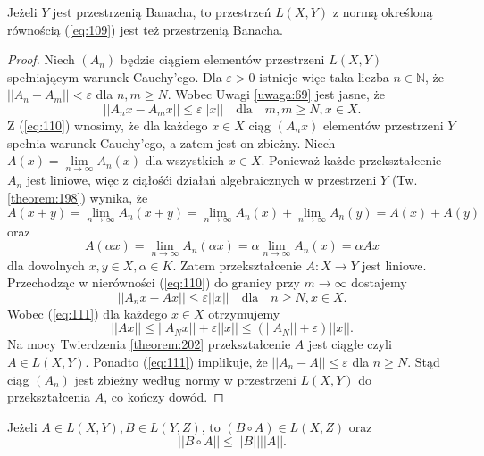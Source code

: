 \documentclass[leqno]{article}
\begin{document}
\begin{justify}
\begin{theorem}
{
    Jeżeli $Y$ jest przestrzenią Banacha, to przestrzeń $L(X, Y)$ z normą określoną równością (\ref{eq:109}) jest też przestrzenią Banacha.
}
\end{theorem}

\begin{proof}
    Niech $(A_n)$ będzie ciągiem elementów przestrzeni $L(X, Y)$ spełniającym warunek Cauchy'ego. 
    Dla $\varepsilon > 0$ istnieje więc taka liczba $n \in \mathbb{N}$, że $||A_n - A_m|| < \varepsilon$ dla $n,m \geqslant N$.
    Wobec Uwagi \ref{uwaga:69} jest jasne, że 
    \begin{equation}\label{eq:110}
        ||A_nx - A_m x|| \leqslant \varepsilon||x|| \quad \text{dla} \quad m,m \geqslant N, x \in X.
    \end{equation}
    Z (\ref{eq:110}) wnosimy, że dla każdego $x \in X$ ciąg $(A_n x)$ elementów przestrzeni $Y$ spełnia warunek
    Cauchy'ego, a zatem jest on zbieżny. Niech $A(x) = \lim\limits_{n \to \infty} A_n(x)$ dla
    wszystkich $x \in X$. Ponieważ każde przekształcenie $A_n$ jest liniowe, więc z ciąłośći działań algebraicznych 
    w przestrzeni $Y$ (Tw. \ref{theorem:198}) wynika, że 
    \[
        A(x + y) = \lim\limits_{n \to \infty} A_n(x + y) = \lim\limits_{n \to \infty}A_n(x) + \lim\limits_{n \to \infty}A_n(y) = A(x) + A(y)
    \]
    oraz
    \[
        A(\alpha x) = \lim\limits_{n \to \infty} A_n(\alpha x) = \alpha \lim\limits_{n \to \infty}A_n(x) = \alpha A x
    \]
    dla dowolnych $x, y \in X, \alpha \in K$. Zatem przekształcenie $A : X \to Y$ jest liniowe.
    Przechodząc w nierówności (\ref{eq:110}) do granicy przy $m \to \infty$ dostajemy 
    \begin{equation}\label{eq:111}
        ||A_n x - A x || \leqslant \varepsilon ||x|| \quad \text{dla} \quad n \geqslant N, x \in X.
    \end{equation}
    Wobec (\ref{eq:111}) dla każdego $x \in X$ otrzymujemy 
    \[
        ||A x|| \leqslant ||A_N x|| + \varepsilon ||x|| \leqslant (||A_N|| + \varepsilon)||x||.
    \]
    Na mocy Twierdzenia \ref{theorem:202} przekształcenie $A$ jest ciągłe czyli $A \in L(X, Y)$.
    Ponadto (\ref{eq:111}) implikuje, że $||A_n - A|| \leqslant \varepsilon$ dla $n \geqslant N$.
    Stąd ciąg $(A_n)$ jest zbieżny według normy w przestrzeni $L(X, Y)$ do przekształcenia $A$, co kończy dowód.
\end{proof}

\begin{theorem}
{
    Jeżeli $A \in L(X, Y), B \in L(Y, Z)$, to $(B \circ A) \in L(X, Z)$ oraz 
    \begin{equation}\label{eq:112}
        ||B \circ A|| \leqslant ||B||||A||.
    \end{equation}
}
\end{theorem}


\end{justify}
\end{document}
